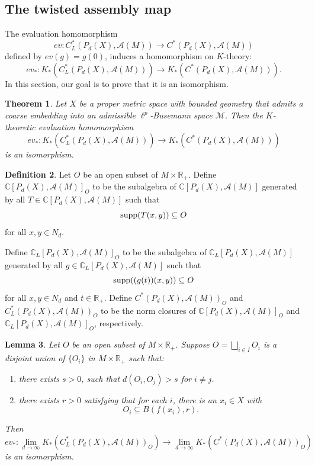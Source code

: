 \documentclass{article}
\theoremstyle{plain}
\newtheorem{theorem}{Theorem}[section]
\newtheorem{lemma}[theorem]{Lemma}
\theoremstyle{definition}
\newtheorem{definition}[theorem]{Definition}
\theoremstyle{remark}
\def\A{\mathcal A}
\def\IC{\mathbb C}
\begin{document}
	\subsection{The twisted assembly map}
	The evaluation homomorphism
	$$ev :C^*_{L}(P_d(X),\A(M))\to C^*(P_d(X),\A(M))$$
	defined by $ev(g)=g(0)$, induces a homomorphism on $K$-theory:
	$$ev_*:K_*(C^*_{L}(P_d(X),\A(M)))\to K_*(C^*(P_d(X),\A(M))).$$
	In this section, our goal is to prove that it is an isomorphism.
	\begin{theorem}\label{twisted Baum-Connes}
			Let \(X\) be a proper metric space with bounded geometry that admits a coarse embedding into an admissible \(\ell^p\)-Busemann space \(\mathcal M\). Then the $K$-theoretic evaluation homomorphism
		$$ev_*:K_*(C^*_{L}(P_d(X),\A(M)))\to K_*(C^*(P_d(X),\A(M)))$$
		is an isomorphism.
	\end{theorem}
	\begin{definition}
		Let $O$ be an open subset of $M\times\mathbb R_+$. Define $\IC[P_d(X),\mathcal A(M)]_O$ to be the subalgebra of $\IC[P_d(X),\mathcal A(M)]$ generated by all $T\in\mathbb C[P_d(X),\mathcal A(M)]$ such that
		$$\textup{supp}(T(x,y))\subseteq O$$
		for all $x,y\in N_d$.
		
		Define $\IC_L[P_d(X),\mathcal A(M)]_O$ to be the subalgebra of $\IC_L[P_d(X),\mathcal A(M)]$ generated by all $g\in\mathbb C_L[P_d(X),\mathcal A(M)]$ such that
		$$\textup{supp}((g(t))(x,y))\subseteq O$$
		for all $x,y\in N_d$ and $t\in\mathbb R_+$.
		Define $C^*(P_d(X),\mathcal A(M))_O$ and $C^*_L(P_d(X),\mathcal A(M))_O$ to be the norm closures of $\IC[P_d(X),\mathcal A(M)]_O$ and $\IC_L[P_d(X),\mathcal A(M)]_O$, respectively.
	\end{definition}
	
	\begin{lemma}\label{slice}
		Let $O$ be an open subset of $M\times\mathbb R_+$. Suppose $O=\bigsqcup_{i\in I}O_i$ is a disjoint union of $\{O_i\}$ in $M\times\mathbb R_+$ such that:
		\begin{enumerate}
			\item there exists $s>0$, such that $d(O_i,O_j)>s$ for $i\neq j$.
			\item there exists $r>0$ satisfying that for each $i$, there is an $x_i\in X$ with
			$$O_{i}\subseteq B(f(x_i),r).$$
		\end{enumerate} 
		Then $$ev_*:\lim_{d\to\infty}K_*\left(C^*_L(P_d(X),\mathcal A(M))_O\right)\to\lim_{d\to\infty}K_*\left(C^*(P_d(X),\mathcal A(M))_O\right)$$
		is an isomorphism.	
	\end{lemma}
	
\end{document}
